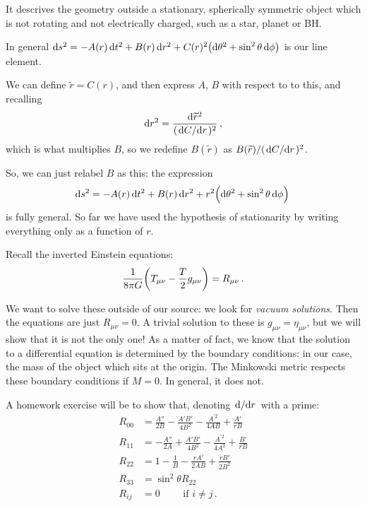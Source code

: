 \documentclass[main.tex]{subfiles}
\begin{document}
It descrives the geometry outside a stationary, spherically symmetric object which is not rotating and not electrically charged, such as a star, planet or BH.

In general \(\dd{s^2} = -A(r) \dd{t^2} + B(r) \dd{r^2} + C(r)^2 \qty(\dd{\theta^2} + \sin^2 \theta \dd{\phi })\) is our line element.

We can define \(\widetilde{r} = C(r)\), and then express \(A\), \(B\) with respect to to this, and recalling 
%
\begin{align}
    \dd{r^2} = 
  \frac{\dd{\widetilde{r}^2} }{(\dv*{C}{r})^2}
\,,
\end{align}
%
which is what multiplies \(B\), so we redefine \(B(\widetilde{r}) \) as \(B(\widetilde{r}) / (\dv*{C}{r})^2\).

So, we can just relabel \(B\) as this: the expression 
%
\begin{align}
    \dd{s^2} = -A(r) \dd{t^2} + B(r) \dd{r^2} + r^2\qty(\dd{\theta^2} + \sin^2 \theta \dd{\phi })
\,
\end{align}
%
is fully general. So far we have used the hypothesis of stationarity by writing everything only as a function of \(r\).

Recall the inverted Einstein equations: 
%
\begin{align}
  \frac{1}{8 \pi G} \qty(T_{\mu \nu } - \frac{T}{2} g_{\mu \nu }) = R_{\mu \nu }
\,.
\end{align}
%

We want to solve these outside of our source: we look for \emph{vacuum solutions}. Then the equations are just \(R_{\mu \nu } =0\).
A trivial solution to these is \(g_{\mu \nu } = \eta_{\mu \nu }\), but we will show that it is not the only one!
As a matter of fact, we know that the solution to a differential equation is determined by the boundary conditions: in our case, the mass of the object which sits at the origin.
The Minkowski metric respects these boundary conditions if \(M=0\). In general, it does not.

A homework exercise will be to show that, denoting \(\dv*{}{r}\) with a prime: 
%
\begin{subequations}
\begin{align}
    R_{00} &= \frac{A''}{2B} - \frac{A' B'}{4B^2} - \frac{A^{\prime 2}}{4AB} + \frac{A'}{rB}  \\
    R_{11} &= -\frac{A''}{2A} + \frac{A' B'}{4B^2} - \frac{A^{\prime 2}}{4A^2} + \frac{B'}{rB} \\
    R_{22} &= 1 - \frac{1}{B} - \frac{r A' }{2 AB} + \frac{rB'}{2 B^2}  \\
    R_{33} &= \sin^2 \theta  R_{22} \\
    R_{ij} &= 0 \qquad \text{ if } i \neq j
\,.
\end{align}
\end{subequations}
\end{document}
